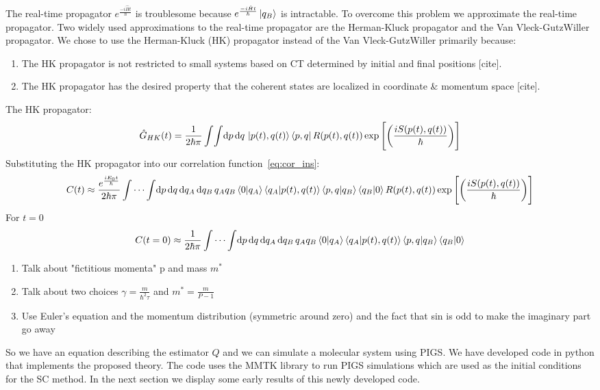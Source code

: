 \documentclass[12pt,letterpaper,oneside,final,titlepage]{article}               %
\numberwithin{equation}{section} %
\newcommand{\emiHt}{e^{\frac{-i\hat{H}t}{\hbar}}}
\newcommand{\expb}[1]{\ensuremath{\exp{\left[ #1 \right]}}}
\begin{document}
The real-time propagator $\emiHt$ is troublesome because $\emiHt\ket{q_{B}}$ is intractable. 
To overcome this problem we approximate the real-time propagator.
Two widely used approximations to the real-time propagator are the Herman-Kluck propagator and the Van Vleck-GutzWiller propagator.
We chose to use the Herman-Kluck (HK) propagator instead of the Van Vleck-GutzWiller primarily because:
\begin{enumerate}
    \item The HK propagator is not restricted to small systems based on CT determined by initial and final positions [cite].
    \item The HK propagator has the desired property that the coherent states are localized in coordinate $\&$ momentum space [cite].
\end{enumerate}
The HK propagator:
\begin{equation}\label{eq:HKprop}
    \hat{G}_{HK}(t) = \frac{1}{2\hbar\pi}\int\!\int \!\dif p\,\!\dif q\, 
    \ket{p(t), q(t)}\bra{p,q} R(p(t),q(t))
    \expb{\left(\frac{iS(p(t),q(t))}{\hbar}\right)}
\end{equation}
Substituting the HK propagator into our correlation function~\eqref{eq:cor_ins}:
\begin{equation*}
    C(t) \approx \frac{e^{\frac{iE_{0}t}{\hbar}}}{2\hbar\pi}\int\cdots\int\! \dif p\,\!\dif q\,\!\dif q_{A}\,\!\dif q_{B}\,
    q_{A}q_{B}\braket{0|q_{A}}\braket{q_{A}|p(t), q(t)} \braket{p,q|q_{B}}\braket{q_{B}|0}
    R(p(t),q(t)) \expb{\left(\frac{iS(p(t),q(t))}{\hbar}\right)}
\end{equation*}
For $t=0$
\begin{equation*}
    C(t=0) \approx \frac{1}{2\hbar\pi}\int\cdots\int\! \dif p\,\!\dif q\,\!\dif q_{A}\,\!\dif q_{B}\,
    q_{A}q_{B}\braket{0|q_{A}}\braket{q_{A}|p(t), q(t)} \braket{p,q|q_{B}}\braket{q_{B}|0}
\end{equation*}
\begin{enumerate}
    \item Talk about "fictitious momenta" p and mass $m^{*}$
    \item Talk about two choices $\gamma = \frac{m}{\hbar^{2}\tau}$ and $m^{*} = \frac{m}{P-1}$
    \item Use Euler's equation and the momentum distribution (symmetric around zero) and the fact that sin is odd to make the imaginary part go away
\end{enumerate}


So we have an equation describing the estimator $Q$ and we can simulate a molecular system using PIGS. We have developed code in python that implements the proposed theory. The code uses the MMTK library to run PIGS simulations which are used as the initial conditions for the SC method. In the next section we display some early results of this newly developed code.
\end{document}

